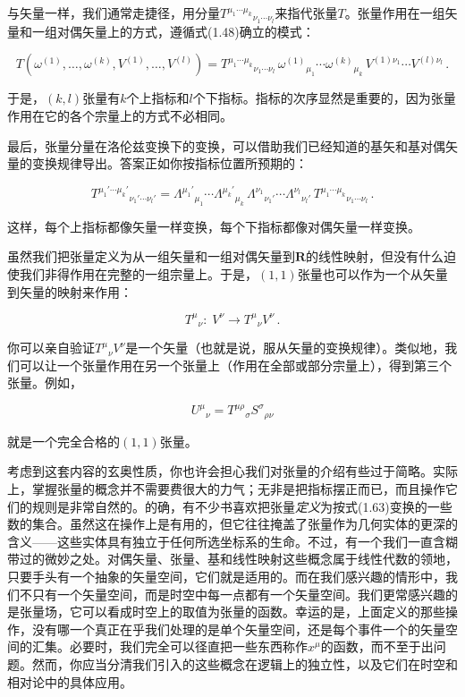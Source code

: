 与矢量一样，我们通常走捷径，用分量$T^{\mu_1\cdots\mu_k}{}_{\nu_1\cdots\nu_l}$来指代张量$T$。张量作用在一组矢量和一组对偶矢量上的方式，遵循式(1.48)确立的模式：

\begin{equation*}
T(\omega^{(1)},\ldots,\omega^{(k)},V^{(1)},\ldots,V^{(l)})
=T^{\mu_1\cdots\mu_k}{}_{\nu_1\cdots\nu_l}\,
\omega^{(1)}{}_{\mu_1}\cdots\omega^{(k)}{}_{\mu_k}\,
V^{(1)\nu_1}\cdots V^{(l)\nu_l}\,.
\tag{1.62}
\end{equation*}

于是，$(k,l)$张量有$k$个上指标和$l$个下指标。指标的次序显然是重要的，因为张量作用在它的各个宗量上的方式不必相同。

最后，张量分量在洛伦兹变换下的变换，可以借助我们已经知道的基矢和基对偶矢量的变换规律导出。答案正如你按指标位置所预期的：

\begin{equation*}
T^{\mu_1'\cdots\mu_k'}{}_{\nu_1'\cdots\nu_l'}
=\Lambda^{\mu_1'}{}_{\mu_1}\cdots\Lambda^{\mu_k'}{}_{\mu_k}\,
\Lambda^{\nu_1}{}_{\nu_1'}\cdots\Lambda^{\nu_l}{}_{\nu_l'}\,
T^{\mu_1\cdots\mu_k}{}_{\nu_1\cdots\nu_l}\,.
\tag{1.63}
\end{equation*}

这样，每个上指标都像矢量一样变换，每个下指标都像对偶矢量一样变换。

虽然我们把张量定义为从一组矢量和一组对偶矢量到$\mathbf{R}$的线性映射，但没有什么迫使我们非得作用在完整的一组宗量上。于是，$(1,1)$张量也可以作为一个从矢量到矢量的映射来作用：

\begin{equation*}
T^{\mu}{}_{\nu}:\;V^{\nu}\rightarrow T^{\mu}{}_{\nu}V^{\nu}\,.
\tag{1.64}
\end{equation*}

你可以亲自验证$T^{\mu}{}_{\nu}V^{\nu}$是一个矢量（也就是说，服从矢量的变换规律）。类似地，我们可以让一个张量作用在另一个张量上（作用在全部或部分宗量上），得到第三个张量。例如，

\begin{equation*}
U^{\mu}{}_{\nu}=T^{\mu\rho}{}_{\sigma}S^{\sigma}{}_{\rho\nu}
\tag{1.65}
\end{equation*}

就是一个完全合格的$(1,1)$张量。

考虑到这套内容的玄奥性质，你也许会担心我们对张量的介绍有些过于简略。实际上，掌握张量的概念并不需要费很大的力气；无非是把指标摆正而已，而且操作它们的规则是非常自然的。的确，有不少书喜欢把张量\emph{定义}为按式(1.63)变换的一些数的集合。虽然这在操作上是有用的，但它往往掩盖了张量作为几何实体的更深的含义——这些实体具有独立于任何所选坐标系的生命。不过，有一个我们一直含糊带过的微妙之处。对偶矢量、张量、基和线性映射这些概念属于线性代数的领地，只要手头有一个抽象的矢量空间，它们就是适用的。而在我们感兴趣的情形中，我们不只有一个矢量空间，而是时空中每一点都有一个矢量空间。我们更常感兴趣的是张量场，它可以看成时空上的取值为张量的函数。幸运的是，上面定义的那些操作，没有哪一个真正在乎我们处理的是单个矢量空间，还是每个事件一个的矢量空间的汇集。必要时，我们完全可以径直把一些东西称作$x^{\mu}$的函数，而不至于出问题。然而，你应当分清我们引入的这些概念在逻辑上的独立性，以及它们在时空和相对论中的具体应用。

